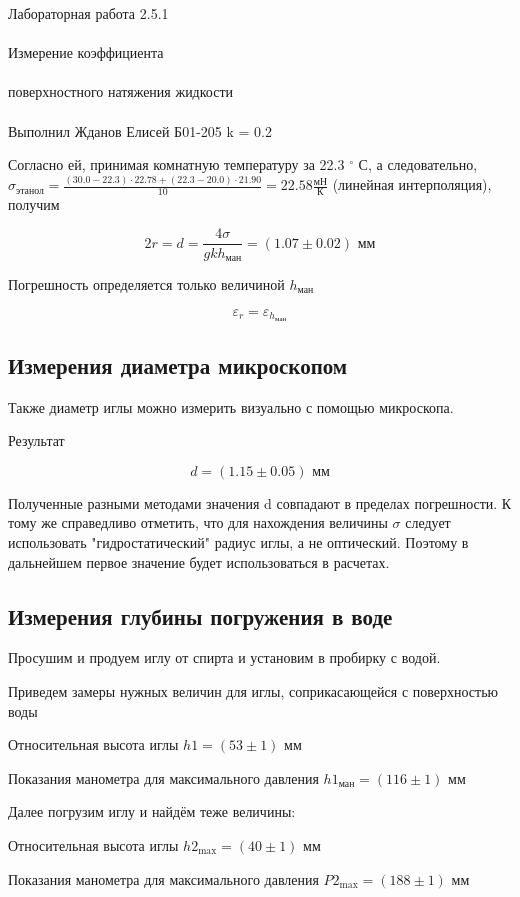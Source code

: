 \documentclass{astroedu-lab}
\begin{document}
\begin{problem}{\huge Лабораторная работа 2.5.1\\\\Измерение коэффициента\\\\поверхностного натяжения жидкости\\\\Выполнил Жданов Елисей Б01-205}
k = 0.2

Согласно ей, принимая комнатную температуру за 22.3 $^\circ$ С, а следовательно, $\sigma_\text{этанол} = \frac{(30.0 - 22.3) \cdot 22.78 + (22.3 - 20.0) \cdot 21.90}{10} = 22.58 \frac{\text{мН}}{\text{К}}$ (линейная интерполяция), получим

\begin{equation}
	2r = d = \frac{4 \sigma}{g k h_\text{ман}} = (1.07 \pm 0.02) \text{ мм}
\end{equation}

Погрешность определяется только величиной $h_\text{ман}$

\begin{equation}
	\varepsilon_{r} = \varepsilon_{h_\text{ман}}
\end{equation}

\subsection{Измерения диаметра микроскопом}

Также диаметр иглы можно измерить визуально с помощью микроскопа.

Результат

\[
d = (1.15 \pm 0.05) \text{ мм}
\]

Полученные разными методами значения d совпадают в пределах погрешности. К тому же справедливо отметить, что для нахождения величины $\sigma$ следует использовать "гидростатический" радиус иглы, а не оптический. Поэтому в дальнейшем первое значение будет использоваться в расчетах.

\subsection{Измерения глубины погружения в воде}

Просушим и продуем иглу от спирта и установим в пробирку с водой.

Приведем замеры нужных величин для иглы, соприкасающейся с поверхностью воды

Относительная высота иглы $h1 = (53 \pm 1) \text{ мм}$

Показания манометра для максимального давления $h1 _\text{ман} = (116 \pm 1) \text{ мм}$

Далее погрузим иглу и найдём теже величины:

Относительная высота иглы $h2_\text{max} = (40 \pm 1) \text{ мм}$

Показания манометра для максимального давления $P2_\text{max} = (188 \pm 1) \text{ мм}$


\end{problem}
\end{document}
